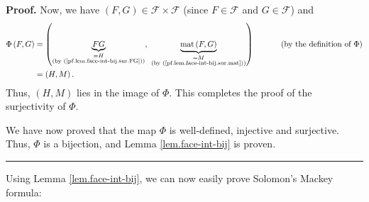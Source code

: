 \documentclass[12pt]{article}
\theoremstyle{definition}%
\theoremstyle{definition}%
\theoremstyle{remark}%
\newcommand{\CF}{\mathcal{F}}
\newcommand{\mat}{\operatorname{mat}}
\newenvironment{proof}[1][Proof]{\noindent\textbf{#1.} }{\ \rule{0.5em}{0.5em}}
\begin{document}
\begin{proof}
Now, we have $\left(  F,G\right)  \in\CF \times\CF $ (since
$F\in\CF $ and $G\in\CF $) and
\begin{align*}
\Phi\left(  F,G\right)   &  =\left(  \underbrace{FG}_{\substack{=H\\\text{(by
(\ref{pf.lem.face-int-bij.sur.FG}))}}},\ \underbrace{\mat
\left(  F,G\right)  }_{\substack{=M\\\text{(by
(\ref{pf.lem.face-int-bij.sur.mat}))}}}\right)  \ \ \ \ \ \ \ \ \ \ \left(
\text{by the definition of }\Phi\right)  \\
&  =\left(  H,M\right)  .
\end{align*}
Thus, $\left(  H,M\right)  $ lies in the image of $\Phi$. This completes the
proof of the surjectivity of $\Phi$. \medskip

We have now proved that the map $\Phi$ is well-defined, injective and
surjective. Thus, $\Phi$ is a bijection, and Lemma \ref{lem.face-int-bij} is proven.
\end{proof}

Using Lemma \ref{lem.face-int-bij}, we can now easily prove Solomon's Mackey formula:
\end{document}
